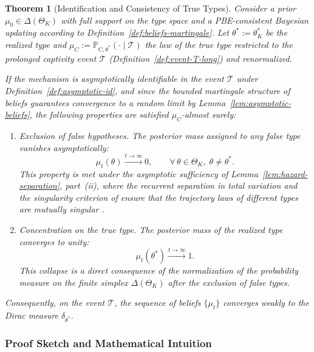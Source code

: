 \documentclass[review,authoryear,12pt]{elsarticle}
\theoremstyle{plain}
\newtheorem{theorem}{Theorem}
\theoremstyle{definition}
\newcommand{\ProbC}[1]{\mathbb{P}_{\mathrm{C},#1}}
\newcommand{\ThetaK}{\Theta_K}
\newcommand{\1}{\mathbf{1}}
\begin{document}
\begin{theorem}[Identification and Consistency of True Types]\label{thm:posterior-consistency}
\normalfont
Consider a prior $\mu_0\in\Delta(\ThetaK)$ with full support on the type space and a PBE-consistent Bayesian updating according to Definition~\ref{def:beliefs-martingale}. Let $\theta^\ast:=\theta_K^\ast$ be the realized type and $\mu_C:=\ProbC{\theta^\ast}(\cdot\mid\mathcal{T})$ the law of the true type restricted to the prolonged captivity event $\mathcal{T}$ \textup{(}Definition~\ref{def:event-T-long}\textup{)} and renormalized.

If the mechanism is asymptotically identifiable in the event $\mathcal{T}$ under Definition~\ref{def:asymptotic-id}, and since the bounded martingale structure of beliefs guarantees convergence to a random limit by Lemma~\ref{lem:asymptotic-beliefs}, the following properties are satisfied $\mu_C$-almost surely:
\begin{enumerate}
  \item Exclusion of false hypotheses. The posterior mass assigned to any false type vanishes asymptotically:
  \begin{equation*}
  \mu_t(\theta)\xrightarrow{t\to\infty}0,\qquad \forall\,\theta\in\ThetaK,\;\theta\neq\theta^\ast.
  \end{equation*}
  This property is met under the asymptotic sufficiency of Lemma~\ref{lem:hazard-separation}, part~\textup{(ii)}, where the recurrent separation in total variation and the singularity criterion of \citet{Kakutani1948} ensure that the trajectory laws of different types are mutually singular \citet{Shiryaev2019Probability}.

  \item Concentration on the true type. The posterior mass of the realized type converges to unity:
  \begin{equation*}
  \mu_t(\theta^\ast)\xrightarrow{t\to\infty}1.
  \end{equation*}
  This collapse is a direct consequence of the normalization of the probability measure on the finite simplex $\Delta(\ThetaK)$ after the exclusion of false types.
\end{enumerate}
Consequently, on the event $\mathcal{T}$, the sequence of beliefs $\{\mu_t\}$ converges weakly to the Dirac measure $\delta_{\theta^\ast}$.
\end{theorem}

\subsubsection*{Proof Sketch and Mathematical Intuition}
\end{document}
